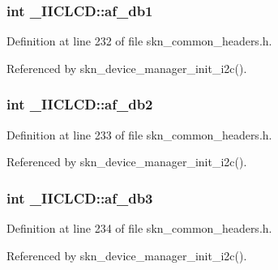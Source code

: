 \hypertarget{struct___i_i_c_l_c_d_a114a5f81c889fe857d714a3a5033b397}{}
\subsubsection[{af\+\_\+db1}]{\setlength{\rightskip}{0pt plus 5cm}int \+\_\+\+I\+I\+C\+L\+C\+D\+::af\+\_\+db1}\label{struct___i_i_c_l_c_d_a114a5f81c889fe857d714a3a5033b397}


Definition at line 232 of file skn\+\_\+common\+\_\+headers.\+h.



Referenced by skn\+\_\+device\+\_\+manager\+\_\+init\+\_\+i2c().

\hypertarget{struct___i_i_c_l_c_d_a7b88e6903c8fb93882c396261ffe40b5}{}
\subsubsection[{af\+\_\+db2}]{\setlength{\rightskip}{0pt plus 5cm}int \+\_\+\+I\+I\+C\+L\+C\+D\+::af\+\_\+db2}\label{struct___i_i_c_l_c_d_a7b88e6903c8fb93882c396261ffe40b5}


Definition at line 233 of file skn\+\_\+common\+\_\+headers.\+h.



Referenced by skn\+\_\+device\+\_\+manager\+\_\+init\+\_\+i2c().

\hypertarget{struct___i_i_c_l_c_d_a26f362cb78eb2227a14706e9c992a066}{}
\subsubsection[{af\+\_\+db3}]{\setlength{\rightskip}{0pt plus 5cm}int \+\_\+\+I\+I\+C\+L\+C\+D\+::af\+\_\+db3}\label{struct___i_i_c_l_c_d_a26f362cb78eb2227a14706e9c992a066}


Definition at line 234 of file skn\+\_\+common\+\_\+headers.\+h.



Referenced by skn\+\_\+device\+\_\+manager\+\_\+init\+\_\+i2c().

